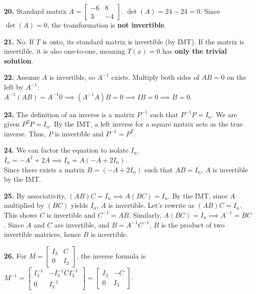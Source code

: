 \documentclass[12pt]{article}
\begin{document}
\textbf{20.} Standard matrix $A = \begin{bmatrix} -6 & 8 \\ 3 & -4 \end{bmatrix}$. $\det(A) = 24 - 24 = 0$. Since $\det(A) = 0$, the transformation is \textbf{not invertible}.

\textbf{21.} No. If $T$ is onto, its standard matrix is invertible (by IMT). If the matrix is invertible, it is also one-to-one, meaning $T(x) = 0$ has \textbf{only the trivial solution}.

\textbf{22.} Assume $A$ is invertible, so $A^{-1}$ exists. Multiply both sides of $AB = 0$ on the left by $A^{-1}$: \\
$A^{-1}(AB) = A^{-1}0 \implies (A^{-1}A)B = 0 \implies IB = 0 \implies B = 0$.

\textbf{23.} The definition of an inverse is a matrix $P^{-1}$ such that $P^{-1}P = I_n$. We are given $P^T P = I_n$. By the IMT, a left inverse for a square matrix acts as the true inverse. Thus, $P$ is invertible and $P^{-1} = P^T$.

\textbf{24.} We can factor the equation to isolate $I_n$. \\
$I_n = -A^2 + 2A \implies I_n = A(-A + 2I_n)$. \\
Since there exists a matrix $B = (-A + 2I_n)$ such that $AB = I_n$, $A$ is invertible by the IMT.

\textbf{25.} By associativity, $(AB)C = I_n \implies A(BC) = I_n$. By the IMT, since $A$ multiplied by $(BC)$ yields $I_n$, $A$ is invertible. Let's rewrite as $(AB)C = I_n$. This shows $C$ is invertible and $C^{-1} = AB$. Similarly, $A(BC) = I_n \implies A^{-1} = BC$. Since $A$ and $C$ are invertible, and $B = A^{-1} C^{-1}$, $B$ is the product of two invertible matrices, hence $B$ is invertible. 

\textbf{26.} For $M = \begin{bmatrix} I_3 & C \\ 0 & I_3 \end{bmatrix}$, the inverse formula is $M^{-1} = \begin{bmatrix} I_3^{-1} & -I_3^{-1} C I_3^{-1} \\ 0 & I_3^{-1} \end{bmatrix} = \begin{bmatrix} I_3 & -C \\ 0 & I_3 \end{bmatrix}$.
\end{document}
